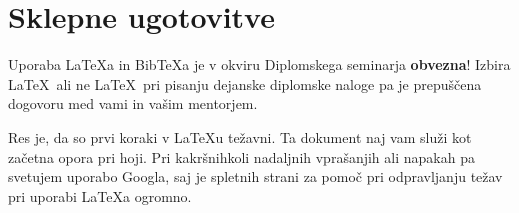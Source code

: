 \documentclass[a4paper, 12pt]{book}
\newcommand{\BibTeX}{{\sc Bib}\TeX}
\begin{document}
\chapter{Sklepne ugotovitve}

Uporaba \LaTeX{a} in \BibTeX{a} je v okviru Diplomskega seminarja \textbf{obvezna}!
Izbira \LaTeX\ ali ne \LaTeX\ pri pisanju dejanske diplomske naloge pa je pre\-pu\-šče\-na dogovoru med vami in vašim mentorjem.

Res je, da so prvi koraki v \LaTeX{}u težavni. 
Ta dokument naj vam služi kot začetna opora pri hoji.
Pri kakršnihkoli nadaljnih vprašanjih ali napakah pa svetujem uporabo Googla, saj je spletnih strani za pomoč pri odpravljanju težav pri uporabi \LaTeX{}a ogromno.


\newpage %
\ \\
\clearpage
{}


\end{document}
